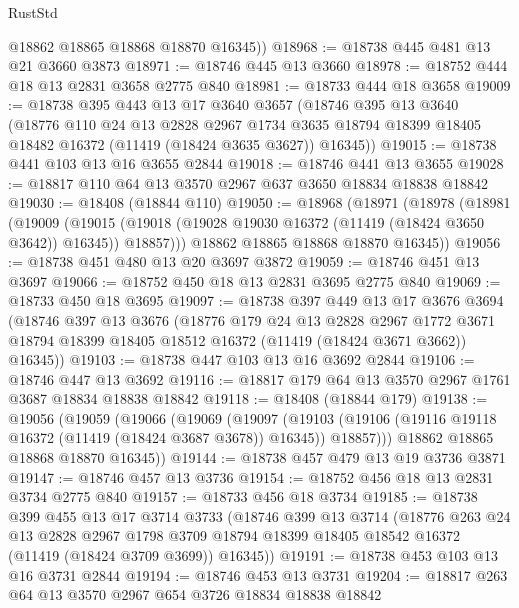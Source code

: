 \begin{lexlean}{RustStd}
\begin{coremodule}
        @18862
        @18865
        @18868
        @18870
        @16345))
@18968 := @18738 @445 @481 @13 @21 @3660 @3873
@18971 := @18746 @445 @13 @3660
@18978 := @18752 @444 @18 @13 @2831 @3658 @2775 @840
@18981 := @18733 @444 @18 @3658
@19009 := @18738
    @395
    @443
    @13
    @17
    @3640
    @3657
    (@18746
      @395
      @13
      @3640
      (@18776
        @110
        @24
        @13
        @2828
        @2967
        @1734
        @3635
        @18794
        @18399
        @18405
        @18482
        @16372
        (@11419 (@18424 @3635 @3627))
        @16345))
@19015 := @18738 @441 @103 @13 @16 @3655 @2844
@19018 := @18746 @441 @13 @3655
@19028 := @18817 @110 @64 @13 @3570 @2967 @637 @3650 @18834 @18838 @18842
@19030 := @18408 (@18844 @110)
@19050 := @18968
    (@18971
      (@18978
        (@18981
          (@19009
            (@19015 (@19018 (@19028 @19030 @16372 (@11419 (@18424 @3650 @3642)) @16345)) @18857)))
        @18862
        @18865
        @18868
        @18870
        @16345))
@19056 := @18738 @451 @480 @13 @20 @3697 @3872
@19059 := @18746 @451 @13 @3697
@19066 := @18752 @450 @18 @13 @2831 @3695 @2775 @840
@19069 := @18733 @450 @18 @3695
@19097 := @18738
    @397
    @449
    @13
    @17
    @3676
    @3694
    (@18746
      @397
      @13
      @3676
      (@18776
        @179
        @24
        @13
        @2828
        @2967
        @1772
        @3671
        @18794
        @18399
        @18405
        @18512
        @16372
        (@11419 (@18424 @3671 @3662))
        @16345))
@19103 := @18738 @447 @103 @13 @16 @3692 @2844
@19106 := @18746 @447 @13 @3692
@19116 := @18817 @179 @64 @13 @3570 @2967 @1761 @3687 @18834 @18838 @18842
@19118 := @18408 (@18844 @179)
@19138 := @19056
    (@19059
      (@19066
        (@19069
          (@19097
            (@19103 (@19106 (@19116 @19118 @16372 (@11419 (@18424 @3687 @3678)) @16345)) @18857)))
        @18862
        @18865
        @18868
        @18870
        @16345))
@19144 := @18738 @457 @479 @13 @19 @3736 @3871
@19147 := @18746 @457 @13 @3736
@19154 := @18752 @456 @18 @13 @2831 @3734 @2775 @840
@19157 := @18733 @456 @18 @3734
@19185 := @18738
    @399
    @455
    @13
    @17
    @3714
    @3733
    (@18746
      @399
      @13
      @3714
      (@18776
        @263
        @24
        @13
        @2828
        @2967
        @1798
        @3709
        @18794
        @18399
        @18405
        @18542
        @16372
        (@11419 (@18424 @3709 @3699))
        @16345))
@19191 := @18738 @453 @103 @13 @16 @3731 @2844
@19194 := @18746 @453 @13 @3731
@19204 := @18817 @263 @64 @13 @3570 @2967 @654 @3726 @18834 @18838 @18842

\end{coremodule}
\end{lexlean}
